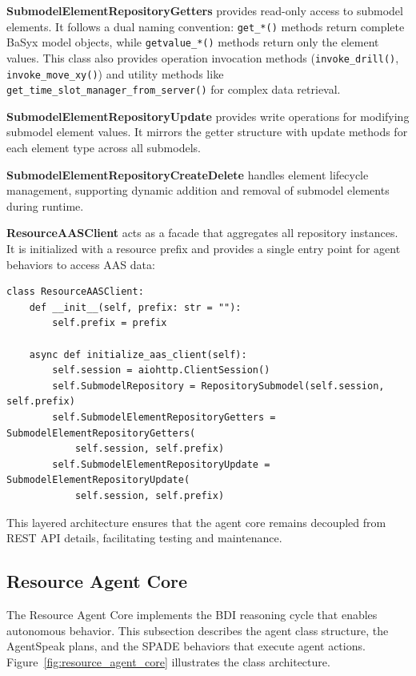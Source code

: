 \textbf{SubmodelElementRepositoryGetters} provides read-only access to submodel elements. It follows a dual naming convention: \texttt{get\_*()} methods return complete BaSyx model objects, while \texttt{getvalue\_*()} methods return only the element values. This class also provides operation invocation methods (\texttt{invoke\_drill()}, \texttt{invoke\_move\_xy()}) and utility methods like \texttt{get\_time\_slot\_manager\_from\_server()} for complex data retrieval.

\textbf{SubmodelElementRepositoryUpdate} provides write operations for modifying submodel element values. It mirrors the getter structure with update methods for each element type across all submodels.

\textbf{SubmodelElementRepositoryCreateDelete} handles element lifecycle management, supporting dynamic addition and removal of submodel elements during runtime.

\textbf{ResourceAASClient} acts as a facade that aggregates all repository instances. It is initialized with a resource prefix and provides a single entry point for agent behaviors to access \ac{AAS} data:

\begin{verbatim}
class ResourceAASClient:
    def __init__(self, prefix: str = ""):
        self.prefix = prefix
        
    async def initialize_aas_client(self):
        self.session = aiohttp.ClientSession()
        self.SubmodelRepository = RepositorySubmodel(self.session, self.prefix)
        self.SubmodelElementRepositoryGetters = SubmodelElementRepositoryGetters(
            self.session, self.prefix)
        self.SubmodelElementRepositoryUpdate = SubmodelElementRepositoryUpdate(
            self.session, self.prefix)
\end{verbatim}

This layered architecture ensures that the agent core remains decoupled from REST API details, facilitating testing and maintenance.

\subsection{Resource Agent Core}
\label{subsec:resource_agent_core}

The Resource Agent Core implements the \ac{BDI} reasoning cycle that enables autonomous behavior. This subsection describes the agent class structure, the AgentSpeak plans, and the SPADE behaviors that execute agent actions. Figure~\ref{fig:resource_agent_core} illustrates the class architecture.

